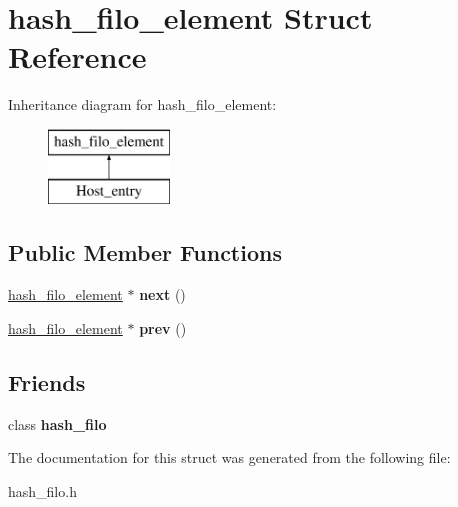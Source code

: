 \hypertarget{structhash__filo__element}{}\section{hash\+\_\+filo\+\_\+element Struct Reference}
\label{structhash__filo__element}
Inheritance diagram for hash\+\_\+filo\+\_\+element\+:\begin{figure}[H]
\begin{center}
\leavevmode
\includegraphics[height=2.000000cm]{structhash__filo__element}
\end{center}
\end{figure}
\subsection*{Public Member Functions}
\begin{DoxyCompactItemize}
\item 
\mbox{\label{structhash__filo__element_adf39c027d18a4d29b2734cc96548eb06}} 
\mbox{\hyperlink{structhash__filo__element}{hash\+\_\+filo\+\_\+element}} $\ast$ {\bfseries next} ()
\item 
\mbox{\label{structhash__filo__element_ab7dbd48722a8657565e6deef94688281}} 
\mbox{\hyperlink{structhash__filo__element}{hash\+\_\+filo\+\_\+element}} $\ast$ {\bfseries prev} ()
\end{DoxyCompactItemize}
\subsection*{Friends}
\begin{DoxyCompactItemize}
\item 
\mbox{\label{structhash__filo__element_aa47aa8ed06e6c82fcc78463372d58269}} 
class {\bfseries hash\+\_\+filo}
\end{DoxyCompactItemize}


The documentation for this struct was generated from the following file\+:\begin{DoxyCompactItemize}
\item 
hash\+\_\+filo.\+h\end{DoxyCompactItemize}
